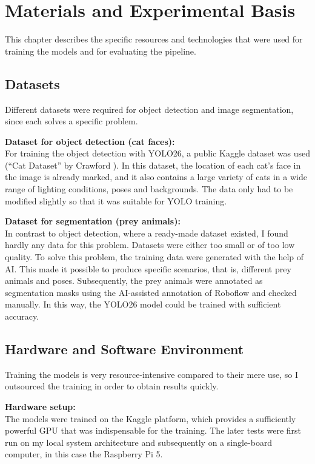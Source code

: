 \chapter{Materials and Experimental Basis}
\label{sec:material}

This chapter describes the specific resources and technologies that were used for training the models and for evaluating the pipeline.

\section{Datasets}
Different datasets were required for object detection and image segmentation, since each solves a specific problem.

\textbf{Dataset for object detection (cat faces):} \\
For training the object detection with YOLO26, a public Kaggle dataset was used (``Cat Dataset'' by Crawford \cite{kaggle2024cat}). In this dataset, the location of each cat's face in the image is already marked, and it also contains a large variety of cats in a wide range of lighting conditions, poses and backgrounds. The data only had to be modified slightly so that it was suitable for YOLO training.

\textbf{Dataset for segmentation (prey animals):} \\
In contrast to object detection, where a ready-made dataset existed, I found hardly any data for this problem. Datasets were either too small or of too low quality. To solve this problem, the training data were generated with the help of AI. This made it possible to produce specific scenarios, that is, different prey animals and poses. Subsequently, the prey animals were annotated as segmentation masks using the AI-assisted annotation of Roboflow \cite{roboflow2025} and checked manually. In this way, the YOLO26 model could be trained with sufficient accuracy.

\section{Hardware and Software Environment}
Training the models is very resource-intensive compared to their mere use, so I outsourced the training in order to obtain results quickly.

\textbf{Hardware setup:} \\
The models were trained on the Kaggle platform, which provides a sufficiently powerful GPU that was indispensable for the training. The later tests were first run on my local system architecture and subsequently on a single-board computer, in this case the Raspberry Pi 5.

